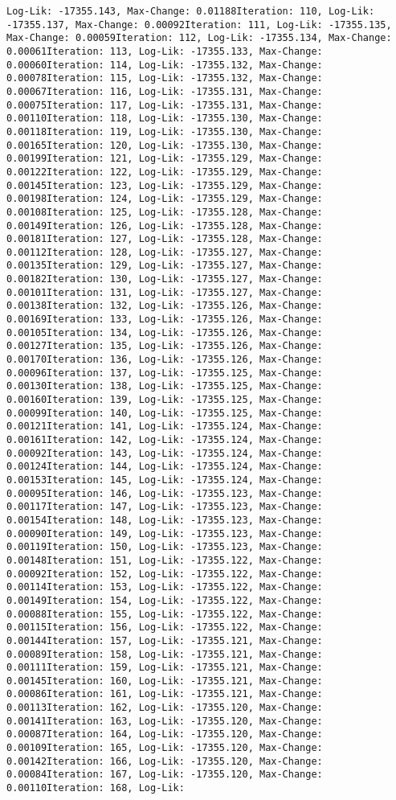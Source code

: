 \documentclass[
]{article}
\begin{document}
\begin{verbatim}
Log-Lik: -17355.143, Max-Change: 0.01188Iteration: 110, Log-Lik: -17355.137, Max-Change: 0.00092Iteration: 111, Log-Lik: -17355.135, Max-Change: 0.00059Iteration: 112, Log-Lik: -17355.134, Max-Change: 0.00061Iteration: 113, Log-Lik: -17355.133, Max-Change: 0.00060Iteration: 114, Log-Lik: -17355.132, Max-Change: 0.00078Iteration: 115, Log-Lik: -17355.132, Max-Change: 0.00067Iteration: 116, Log-Lik: -17355.131, Max-Change: 0.00075Iteration: 117, Log-Lik: -17355.131, Max-Change: 0.00110Iteration: 118, Log-Lik: -17355.130, Max-Change: 0.00118Iteration: 119, Log-Lik: -17355.130, Max-Change: 0.00165Iteration: 120, Log-Lik: -17355.130, Max-Change: 0.00199Iteration: 121, Log-Lik: -17355.129, Max-Change: 0.00122Iteration: 122, Log-Lik: -17355.129, Max-Change: 0.00145Iteration: 123, Log-Lik: -17355.129, Max-Change: 0.00198Iteration: 124, Log-Lik: -17355.129, Max-Change: 0.00108Iteration: 125, Log-Lik: -17355.128, Max-Change: 0.00149Iteration: 126, Log-Lik: -17355.128, Max-Change: 0.00181Iteration: 127, Log-Lik: -17355.128, Max-Change: 0.00112Iteration: 128, Log-Lik: -17355.127, Max-Change: 0.00135Iteration: 129, Log-Lik: -17355.127, Max-Change: 0.00182Iteration: 130, Log-Lik: -17355.127, Max-Change: 0.00101Iteration: 131, Log-Lik: -17355.127, Max-Change: 0.00138Iteration: 132, Log-Lik: -17355.126, Max-Change: 0.00169Iteration: 133, Log-Lik: -17355.126, Max-Change: 0.00105Iteration: 134, Log-Lik: -17355.126, Max-Change: 0.00127Iteration: 135, Log-Lik: -17355.126, Max-Change: 0.00170Iteration: 136, Log-Lik: -17355.126, Max-Change: 0.00096Iteration: 137, Log-Lik: -17355.125, Max-Change: 0.00130Iteration: 138, Log-Lik: -17355.125, Max-Change: 0.00160Iteration: 139, Log-Lik: -17355.125, Max-Change: 0.00099Iteration: 140, Log-Lik: -17355.125, Max-Change: 0.00121Iteration: 141, Log-Lik: -17355.124, Max-Change: 0.00161Iteration: 142, Log-Lik: -17355.124, Max-Change: 0.00092Iteration: 143, Log-Lik: -17355.124, Max-Change: 0.00124Iteration: 144, Log-Lik: -17355.124, Max-Change: 0.00153Iteration: 145, Log-Lik: -17355.124, Max-Change: 0.00095Iteration: 146, Log-Lik: -17355.123, Max-Change: 0.00117Iteration: 147, Log-Lik: -17355.123, Max-Change: 0.00154Iteration: 148, Log-Lik: -17355.123, Max-Change: 0.00090Iteration: 149, Log-Lik: -17355.123, Max-Change: 0.00119Iteration: 150, Log-Lik: -17355.123, Max-Change: 0.00148Iteration: 151, Log-Lik: -17355.122, Max-Change: 0.00092Iteration: 152, Log-Lik: -17355.122, Max-Change: 0.00114Iteration: 153, Log-Lik: -17355.122, Max-Change: 0.00149Iteration: 154, Log-Lik: -17355.122, Max-Change: 0.00088Iteration: 155, Log-Lik: -17355.122, Max-Change: 0.00115Iteration: 156, Log-Lik: -17355.122, Max-Change: 0.00144Iteration: 157, Log-Lik: -17355.121, Max-Change: 0.00089Iteration: 158, Log-Lik: -17355.121, Max-Change: 0.00111Iteration: 159, Log-Lik: -17355.121, Max-Change: 0.00145Iteration: 160, Log-Lik: -17355.121, Max-Change: 0.00086Iteration: 161, Log-Lik: -17355.121, Max-Change: 0.00113Iteration: 162, Log-Lik: -17355.120, Max-Change: 0.00141Iteration: 163, Log-Lik: -17355.120, Max-Change: 0.00087Iteration: 164, Log-Lik: -17355.120, Max-Change: 0.00109Iteration: 165, Log-Lik: -17355.120, Max-Change: 0.00142Iteration: 166, Log-Lik: -17355.120, Max-Change: 0.00084Iteration: 167, Log-Lik: -17355.120, Max-Change: 0.00110Iteration: 168, Log-Lik: 
\end{verbatim}
\end{document}

